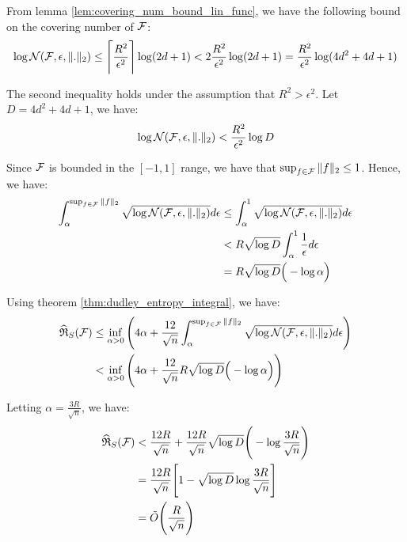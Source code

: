 \begin{proof*}
    \noindent From lemma \ref{lem:covering_num_bound_lin_func}, we have the following bound on the covering number of $\mathcal{F}$:
    \begin{align*}
        \log\mathcal{N}(\mathcal{F}, \epsilon, \|.\|_2) \le \Bigg\lceil \frac{R^2}{\epsilon^2} \Bigg\rceil \log(2d+1) < 2\frac{R^2}{\epsilon^2}\log(2d+1) = \frac{R^2}{\epsilon^2}\log(4d^2 + 4d + 1)
    \end{align*}

    \noindent The second inequality holds under the assumption that $R^2 > \epsilon^2$. Let $D = 4d^2 + 4d + 1$, we have:
    \begin{align*}
        \log\mathcal{N}(\mathcal{F}, \epsilon, \|.\|_2) < \frac{R^2}{\epsilon^2} \log D
    \end{align*}

    \noindent Since $\mathcal{F}$ is bounded in the $[-1, 1]$ range, we have that $\sup_{f\in\mathcal{F}}\|f\|_2 \le 1$. Hence, we have:
    \begin{align*}
        \int_\alpha^{\sup_{f\in\mathcal{F}}\|f\|_2} \sqrt{\log\mathcal{N}(\mathcal{F}, \epsilon, \|.\|_2)} d\epsilon
            &\le \int_\alpha^1 \sqrt{\log\mathcal{N}(\mathcal{F}, \epsilon, \|.\|_2)} d\epsilon \\
            &< R\sqrt{\log D}\int_\alpha^1 \frac{1}{\epsilon}d\epsilon \\
            &= R\sqrt{\log D}\Big(  - \log\alpha  \Big)
    \end{align*}

    \noindent Using theorem \ref{thm:dudley_entropy_integral}, we have:
    \begin{align*}
        \widehat{\mathfrak{R}}_S(\mathcal{F}) 
            &\le \inf_{\alpha>0}\Bigg( 
                4\alpha + \frac{12}{\sqrt n} \int_\alpha^{\sup_{f\in\mathcal{F}}\|f\|_2} \sqrt{\log\mathcal{N}(\mathcal{F}, \epsilon, \|.\|_2)} d\epsilon
             \Bigg) \\
            &< \inf_{\alpha>0}\Bigg( 
                4\alpha + \frac{12}{\sqrt n} R\sqrt{\log D} \Big(  - \log\alpha  \Big)
             \Bigg)
    \end{align*}

    \noindent Letting $\alpha=\frac{3R}{\sqrt n}$, we have:
    \begin{align*}
        \widehat{\mathfrak{R}}_S(\mathcal{F}) &< \frac{12R}{\sqrt n} + \frac{12R}{\sqrt n}\sqrt{\log D} \Bigg(  - \log\frac{3R}{\sqrt n}  \Bigg) \\
        &= \frac{12R}{\sqrt n} \Bigg[ 
            1 - \sqrt{\log D}\log\frac{3R}{\sqrt{n}}
         \Bigg] \\
        &= \tilde O\Bigg(  \frac{R}{\sqrt n}  \Bigg)
    \end{align*}


\end{proof*}
